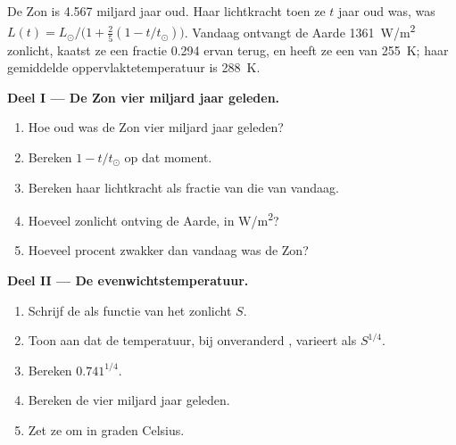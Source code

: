 \begin{problem}
\label{pb:g12:early-earth:1}
De Zon is \num{4.567} miljard jaar oud. Haar lichtkracht toen ze $t$
jaar oud was, was $L(t) = L_\odot/\bigl(1 + \tfrac25 (1 - t/t_\odot)\bigr)$. Vandaag
ontvangt de Aarde \qty{1361}{W/m^2} zonlicht, kaatst ze een fractie 0.294
ervan terug, en heeft ze een  van \qty{255}{K}; haar gemiddelde
oppervlaktetemperatuur is \qty{288}{K}.

\medskip
\noindent\textbf{Deel I --- De Zon vier miljard jaar geleden.}
\begin{enumerate}
  \item Hoe oud was de Zon vier miljard jaar geleden?
  \item Bereken $1 - t/t_\odot$ op dat moment.
  \item Bereken haar lichtkracht als fractie van die van vandaag.
  \item Hoeveel zonlicht ontving de Aarde, in \unit{W/m^2}?
  \item Hoeveel procent zwakker dan vandaag was de Zon?
\end{enumerate}

\medskip
\noindent\textbf{Deel II --- De evenwichtstemperatuur.}
\begin{enumerate}[resume]
  \item Schrijf de  als functie van het zonlicht $S$.
  \item Toon aan dat de temperatuur, bij onveranderd , varieert als
        $S^{1/4}$.
  \item Bereken $0.741^{1/4}$.
  \item Bereken de  vier miljard jaar geleden.
  \item Zet ze om in graden Celsius.
\end{enumerate}


\end{problem}
